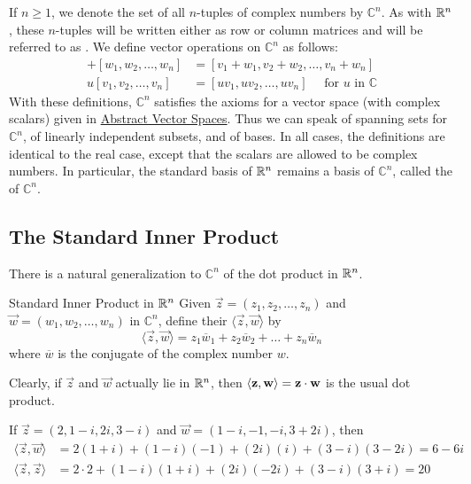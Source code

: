 \documentclass{ximera}
\begin{document}
If $n \ge 1$, we denote the set of all $n$-tuples of complex numbers by $\mathbb{C}^n$. As with $\mathbb{R}^n$, these $n$-tuples will be written either as row or column matrices and will be referred to as . We define vector operations on $\mathbb{C}^n$ as follows:
\begin{align*}
[v_{1},  v_{2}, \ldots, v_{n}] + [w_{1}, w_{2}, \ldots, w_{n}] &= [v_{1} + w_{1}, v_{2} + w_{2}, \ldots, v_{n} + w_{n}] \\
u[v_{1}, v_{2}, \ldots, v_{n}] &= [uv_{1}, uv_{2}, \ldots, uv_{n}] \quad \mbox{ for } u \mbox{ in } \mathbb{C}
\end{align*}
With these definitions, $\mathbb{C}^n$ satisfies the axioms for a vector space (with complex scalars) given in \href{https://ximera.osu.edu/oerlinalg/LinearAlgebra/VSP-0050/main}{Abstract Vector Spaces}. Thus we can speak of spanning sets for $\mathbb{C}^n$, of linearly independent subsets, and of bases. In all cases, the definitions are identical to the real case, except that the scalars are allowed to be complex numbers. In particular, the standard basis of $\mathbb{R}^n$ remains a basis of $\mathbb{C}^n$, called the  of $\mathbb{C}^n$.


\subsection*{The Standard Inner Product}

There is a natural generalization to $\mathbb{C}^n$ of the dot product in $\mathbb{R}^n$.

\begin{definition}{Standard Inner Product in $\mathbb{R}^n$}\label{def:025549}
Given $\vec{z} = (z_{1}, z_{2}, \ldots, z_{n})$ and $\vec{w} = (w_{1}, w_{2}, \ldots, w_{n})$ in $\mathbb{C}^n$, define their  $\langle \vec{z}, \vec{w} \rangle$ by
\begin{equation*}
\langle \vec{z}, \vec{w} \rangle = z_{1}\overline{w}_{1} + z_{2}\overline{w}_{2} + \ldots + z_{n}\overline{w}_{n}
\end{equation*}
where $\overline{w}$ is the conjugate of the complex number $w$.
\end{definition}

Clearly, if $\vec{z}$ and $\vec{w}$ actually lie in $\mathbb{R}^n$, then $\langle \mathbf{z}, \mathbf{w} \rangle = \mathbf{z} \cdot \mathbf{w}$ is the usual dot product.


\begin{example}\label{ex:025563}
If $\vec{z} = (2, 1 - i, 2i, 3 - i)$ and $\vec{w} = (1 - i, -1, -i, 3 + 2i)$, then
\begin{align*}
\langle \vec{z}, \vec{w} \rangle &= 2(1 + i) + (1 - i)(-1) + (2i)(i) + (3 - i)(3 - 2i) = 6 -6i \\
\langle \vec{z}, \vec{z} \rangle &= 2 \cdot 2 + (1 - i)(1 + i) + (2i)(-2i) + (3 - i)(3 + i) = 20
\end{align*}
\end{example}
\end{document}
